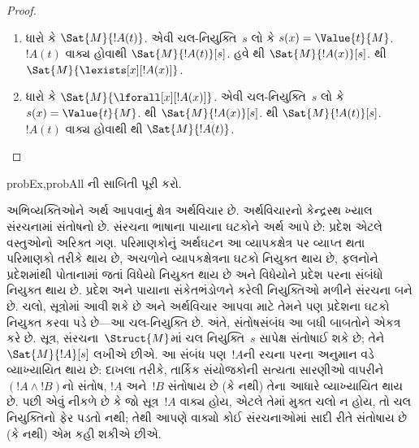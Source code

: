 \begin{proof}
  \begin{enumerate}
    \item %
      ધારો કે $\Sat{M}{!A(t)}$. એવી
        ચલ-નિયુક્તિ~$s$ લો કે $s(x)=\Value{t}{M}$. $!A(t)$
        વાક્ય હોવાથી $\Sat{M}{!A(t)}[s]$. હવે
        થી $\Sat{M}{!A(x)}[s]$.
        થી
        $\Sat{M}{\lexists[x][!A(x)]}$.
    \item %
      ધારો કે
        $\Sat{M}{\lforall[x][!A(x)]}$. એવી ચલ-નિયુક્તિ~$s$ લો કે
        $s(x)=\Value{t}{M}$. થી
        $\Sat{M}{!A(x)}[s]$. થી
        $\Sat{M}{!A(t)}[s]$. $!A(t)$ વાક્ય હોવાથી
        થી $\Sat{M}{!A(t)}$.
  \end{enumerate}
\end{proof}

\begin{probtag}{probEx,probAll}
  ની સાબિતી પૂરી કરો.
\end{probtag}
\endgroup


\OLEndChapterHook
\endgroup
\endgroup


\begingroup
\makeatletter{}\makeatother

\label{guunit:OLP-0159}


\begingroup
\makeatletter{}\makeatother


\label{guunit:OLP-0160}


અભિવ્યક્તિઓને અર્થ આપવાનું ક્ષેત્ર અર્થવિચાર છે. અર્થવિચારનો કેન્દ્રસ્થ
ખ્યાલ સંરચનામાં સંતોષનો છે. સંરચના ભાષાના પાયાના
ઘટકોને અર્થ આપે છે: પ્રદેશ એટલે વસ્તુઓનો અરિક્ત ગણ. પરિમાણકોનું
અર્થઘટન આ વ્યાપકક્ષેત્ર પર વ્યાપ્ત થતા પરિમાણકો તરીકે થાય છે, અચળોને
વ્યાપકક્ષેત્રના ઘટકો નિયુક્ત થાય છે, ફલનોને પ્રદેશમાંથી પોતાનામાં
જતાં વિધેયો નિયુક્ત થાય છે અને વિધેયોને પ્રદેશ પરના સંબંધો
નિયુક્ત થાય છે. પ્રદેશ અને પાયાના સંકેતભંડોળને કરેલી નિયુક્તિઓ
મળીને સંરચના બને છે. ચલો, સૂત્રોમાં આવી શકે
છે અને અર્થવિચાર આપવા માટે તેમને પણ પ્રદેશના ઘટકો નિયુક્ત
કરવા પડે છે---આ ચલ-નિયુક્તિ છે. અંતે, સંતોષસંબંધ આ બધી બાબતોને એકત્ર
કરે છે. સૂત્ર, સંરચના~$\Struct{M}$માં
ચલ નિયુક્તિ~$s$ સાપેક્ષ સંતોષાઈ શકે છે; તેને
$\Sat{M}{!A}[s]$ લખીએ છીએ. આ સંબંધ પણ~$!A$ની રચના પરના અનુમાન વડે
વ્યાખ્યાયિત થાય છે: દાખલા તરીકે, તાર્કિક સંયોજકોની સત્યતા સારણીઓ
વાપરીને $(!A \land !B)$નો સંતોષ, $!A$ અને~$!B$ સંતોષાય છે (કે નથી)
તેના આધારે વ્યાખ્યાયિત થાય છે. પછી એવું નીકળે છે કે જો
સૂત્ર~$!A$ વાક્ય હોય, એટલે તેમાં મુક્ત ચલો ન હોય, તો
ચલ નિયુક્તિનો ફેર પડતો નથી; તેથી આપણે વાક્યો કોઈ
સંરચનાઓમાં સાદી રીતે સંતોષાય છે (કે નથી) એમ કહી શકીએ છીએ.


